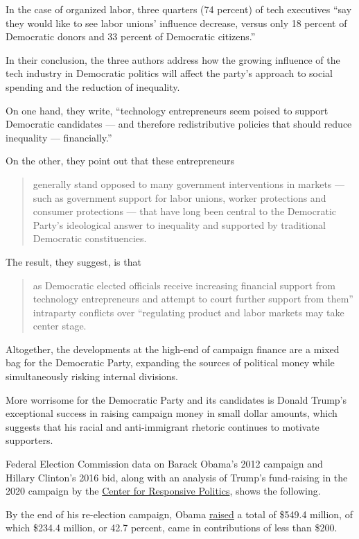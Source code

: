 In the case of organized labor, three quarters (74 percent) of tech
executives ``say they would like to see labor unions' influence
decrease, versus only 18 percent of Democratic donors and 33 percent of
Democratic citizens.''

In their conclusion, the three authors address how the growing influence
of the tech industry in Democratic politics will affect the party's
approach to social spending and the reduction of inequality.

On one hand, they write, ``technology entrepreneurs seem poised to
support Democratic candidates --- and therefore redistributive policies
that should reduce inequality --- financially.''

On the other, they point out that these entrepreneurs

\begin{quote}
generally stand opposed to many government interventions in markets ---
such as government support for labor unions, worker protections and
consumer protections --- that have long been central to the Democratic
Party's ideological answer to inequality and supported by traditional
Democratic constituencies.
\end{quote}

The result, they suggest, is that

\begin{quote}
as Democratic elected officials receive increasing financial support
from technology entrepreneurs and attempt to court further support from
them'' intraparty conflicts over ``regulating product and labor markets
may take center stage.
\end{quote}

Altogether, the developments at the high-end of campaign finance are a
mixed bag for the Democratic Party, expanding the sources of political
money while simultaneously risking internal divisions.

More worrisome for the Democratic Party and its candidates is Donald
Trump's exceptional success in raising campaign money in small dollar
amounts, which suggests that his racial and anti-immigrant rhetoric
continues to motivate supporters.

Federal Election Commission data on Barack Obama's 2012 campaign and
Hillary Clinton's 2016 bid, along with an analysis of Trump's
fund-raising in the 2020 campaign by the
\href{https://www.opensecrets.org/}{Center for Responsive Politics},
shows the following.

By the end of his re-election campaign, Obama
\href{https://www.fec.gov/data/candidate/P80003338/}{raised} a total of
\$549.4 million, of which \$234.4 million, or 42.7 percent, came in
contributions of less than \$200.

